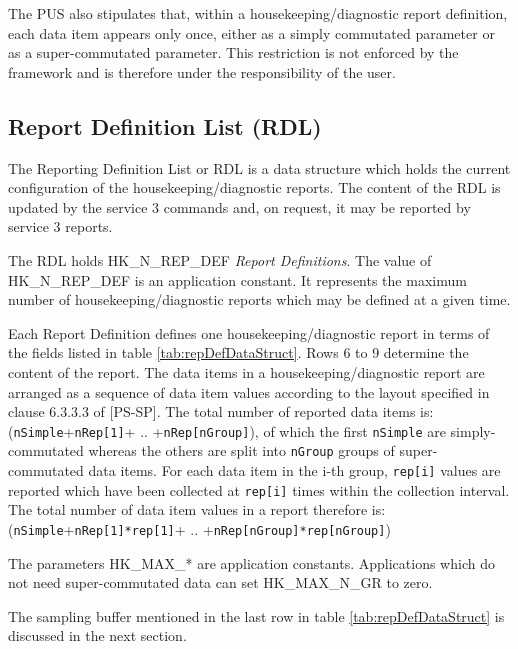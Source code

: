 \documentclass[a4paper,10pt]{article}
\begin{document}
The PUS also stipulates that, within a housekeeping/diagnostic report definition, each data item appears only once, either as a simply commutated parameter or as a super-commutated parameter. This restriction is not enforced by the framework and is therefore under the responsibility of the user.

\subsection{Report Definition List (RDL)}\label{sec:serv3RDL}
The Reporting Definition List or RDL is a data structure which holds the current configuration of the housekeeping/diagnostic reports. The content of the RDL is updated by the service 3 commands and, on request, it may be reported by service 3 reports.

The RDL holds HK\_N\_REP\_DEF \textit{Report Definitions}. The value of HK\_N\_REP\_DEF is an application constant. It represents the maximum number of housekeeping/diagnostic reports which may be defined at a given time. 

Each Report Definition defines one housekeeping/diagnostic report in terms of the fields listed in table \ref{tab:repDefDataStruct}. Rows 6 to 9 determine the content of the report. The data items in a housekeeping/diagnostic report are arranged as a sequence of data item values according to the layout specified in clause 6.3.3.3 of [PS-SP]. The total number of reported data items is: (\texttt{nSimple}+\texttt{nRep[1]}+ .. +\texttt{nRep[nGroup]}), of which the first \texttt{nSimple} are simply-commutated whereas the others are split into \texttt{nGroup} groups of super-commutated data items. For each data item in the i-th group, \texttt{rep[i]} values are reported which have been collected at \texttt{rep[i]} times within the collection interval. The total number of data item values in a report therefore is: (\texttt{nSimple}+\texttt{nRep[1]*rep[1]}+ .. +\texttt{nRep[nGroup]*rep[nGroup]})

The parameters HK\_MAX\_* are application constants. Applications which do not need super-commutated data can set HK\_MAX\_N\_GR to zero.

The sampling buffer mentioned in the last row in table \ref{tab:repDefDataStruct} is discussed in the next section.
\end{document}
